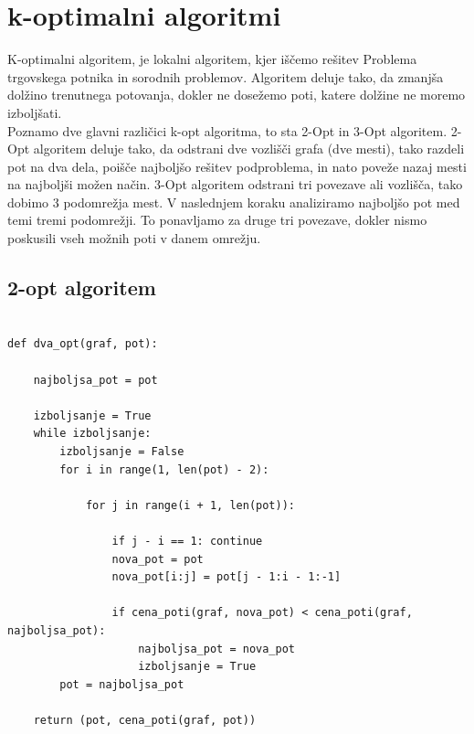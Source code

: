 \documentclass[12pt, a4paper]{article}
\begin{document}
\newpage
\section[k-optimalni algoritmi]{k-optimalni algoritmi}

K-optimalni algoritem, je lokalni algoritem, kjer iščemo rešitev Problema trgovskega potnika in sorodnih problemov. Algoritem deluje tako, da zmanjša dolžino trenutnega potovanja, dokler ne dosežemo poti, katere dolžine ne moremo izboljšati.\\

Poznamo dve glavni različici k-opt algoritma, to sta 2-Opt in 3-Opt algoritem. 2-Opt algoritem deluje tako, da odstrani dve vozlišči grafa (dve mesti), tako razdeli pot na dva dela, poišče najboljšo rešitev podproblema, in nato poveže nazaj mesti na najboljši možen način. 3-Opt algoritem odstrani tri povezave ali vozlišča, tako dobimo 3 podomrežja mest. V naslednjem koraku analiziramo najboljšo pot med temi tremi podomrežji. To ponavljamo za druge tri povezave, dokler nismo poskusili vseh možnih poti v danem omrežju.

\subsection[2-opt algoritem]{2-opt algoritem}

\begin{verbatim}

def dva_opt(graf, pot):

    najboljsa_pot = pot

    izboljsanje = True
    while izboljsanje:
        izboljsanje = False
        for i in range(1, len(pot) - 2):

            for j in range(i + 1, len(pot)):

                if j - i == 1: continue
                nova_pot = pot
                nova_pot[i:j] = pot[j - 1:i - 1:-1]

                if cena_poti(graf, nova_pot) < cena_poti(graf, najboljsa_pot):
                    najboljsa_pot = nova_pot
                    izboljsanje = True
        pot = najboljsa_pot

    return (pot, cena_poti(graf, pot))

\end{verbatim}
\end{document}
